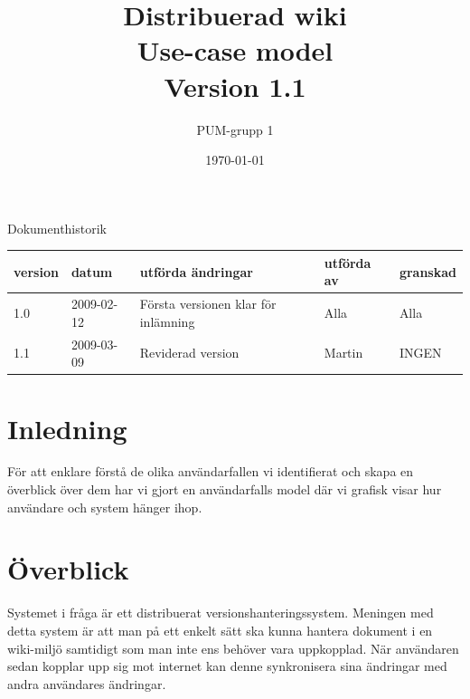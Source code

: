 

\ifpdf
\else
\fi

\title{Distribuerad wiki \\ Use-case model \\ Version 1.1}
\author{PUM-grupp 1}
\date{\today}



\maketitle\thispagestyle{empty}
\newpage

{\centering \Large{Dokumenthistorik\\}}

\vspace{10pt}
\begin{tabularx}{\textwidth}{ |l|l|X|l|l| }
  \hline
    \textbf{version} & \textbf{datum} & \textbf{utförda ändringar} & \textbf{utförda av} & \textbf{granskad} \\
	\hline 
  1.0 & 2009-02-12 &  Första versionen klar för inlämning  & Alla & Alla   \\
  \hline 1.1 & 2009-03-09 & Reviderad version & Martin & INGEN\\
  \hline
\end{tabularx}

\newpage
\setcounter{tocdepth}{2}
\tableofcontents
\newpage

\section{Inledning}
För att enklare förstå de olika användarfallen vi identifierat och skapa en överblick över dem har vi gjort en användarfalls model där vi grafisk visar hur användare och system hänger ihop.
\section{Överblick}
Systemet i fråga är ett distribuerat versionshanteringssystem. Meningen med detta system är att man på ett enkelt sätt ska kunna hantera dokument i en wiki-miljö samtidigt som man inte ens behöver vara uppkopplad. När användaren sedan kopplar upp sig mot internet kan denne synkronisera sina ändringar med andra användares ändringar.
